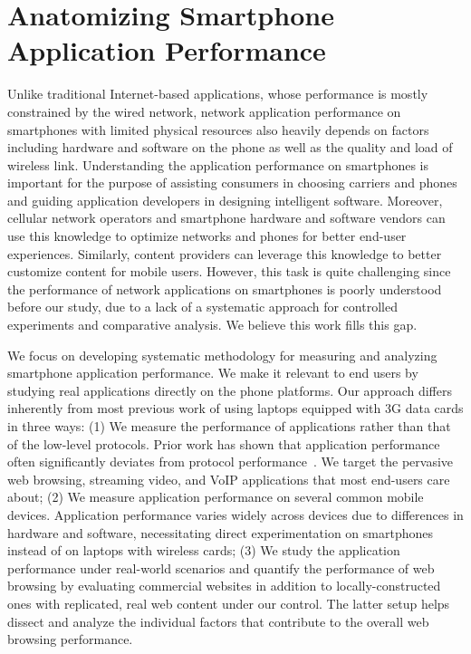 \chapter{Anatomizing Smartphone Application Performance}
\label{chap:app}

Unlike traditional Internet-based applications, whose performance is mostly constrained by the wired network, network application performance on smartphones with limited physical resources also heavily depends on factors including hardware and software on the phone as well as the quality and load of wireless link. Understanding the application performance on smartphones is important for the purpose of assisting consumers in choosing carriers and phones and guiding application developers in designing intelligent software. Moreover, cellular network operators and smartphone hardware and software vendors can use this knowledge to optimize networks and phones for better end-user experiences. Similarly, content providers can leverage this knowledge to better customize content for mobile users. However, this task is quite challenging since the performance of network applications on smartphones is poorly understood before our study, due to a lack of a systematic approach for controlled experiments and comparative analysis. We believe this work fills this gap.

We focus on developing systematic methodology for measuring and analyzing smartphone application performance. We make it relevant to end users by studying real applications directly on the phone platforms. Our approach differs inherently from most previous work of using laptops equipped with 3G data cards in three ways: (1) We measure the performance of applications rather than that of the low-level protocols. Prior work has shown that application performance often significantly deviates from protocol performance~\cite{Zhuang:A3:Mobicom2006}. We target the pervasive web browsing, streaming video, and VoIP applications that most end-users care about; (2) We measure application performance on several common mobile devices. Application performance varies widely across devices due to differences in hardware and software, necessitating direct experimentation on smartphones instead of on laptops with wireless cards; (3) We study the application performance under real-world scenarios and quantify the performance of web browsing by evaluating commercial websites in addition to locally-constructed ones with replicated, real web content under our control. The latter setup helps dissect and analyze the individual factors that contribute to the overall web browsing performance.

